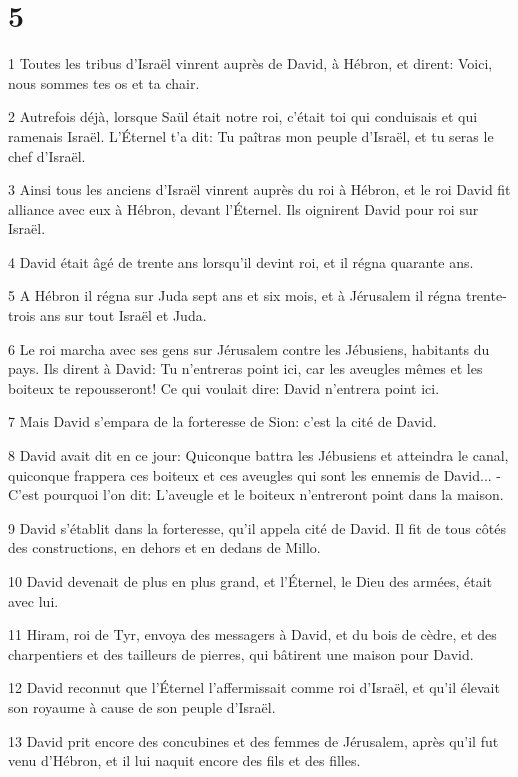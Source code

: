 \chapter{5}

\par 1 Toutes les tribus d'Israël vinrent auprès de David, à Hébron, et dirent: Voici, nous sommes tes os et ta chair.
\par 2 Autrefois déjà, lorsque Saül était notre roi, c'était toi qui conduisais et qui ramenais Israël. L'Éternel t'a dit: Tu paîtras mon peuple d'Israël, et tu seras le chef d'Israël.
\par 3 Ainsi tous les anciens d'Israël vinrent auprès du roi à Hébron, et le roi David fit alliance avec eux à Hébron, devant l'Éternel. Ils oignirent David pour roi sur Israël.
\par 4 David était âgé de trente ans lorsqu'il devint roi, et il régna quarante ans.
\par 5 A Hébron il régna sur Juda sept ans et six mois, et à Jérusalem il régna trente-trois ans sur tout Israël et Juda.
\par 6 Le roi marcha avec ses gens sur Jérusalem contre les Jébusiens, habitants du pays. Ils dirent à David: Tu n'entreras point ici, car les aveugles mêmes et les boiteux te repousseront! Ce qui voulait dire: David n'entrera point ici.
\par 7 Mais David s'empara de la forteresse de Sion: c'est la cité de David.
\par 8 David avait dit en ce jour: Quiconque battra les Jébusiens et atteindra le canal, quiconque frappera ces boiteux et ces aveugles qui sont les ennemis de David... -C'est pourquoi l'on dit: L'aveugle et le boiteux n'entreront point dans la maison.
\par 9 David s'établit dans la forteresse, qu'il appela cité de David. Il fit de tous côtés des constructions, en dehors et en dedans de Millo.
\par 10 David devenait de plus en plus grand, et l'Éternel, le Dieu des armées, était avec lui.
\par 11 Hiram, roi de Tyr, envoya des messagers à David, et du bois de cèdre, et des charpentiers et des tailleurs de pierres, qui bâtirent une maison pour David.
\par 12 David reconnut que l'Éternel l'affermissait comme roi d'Israël, et qu'il élevait son royaume à cause de son peuple d'Israël.
\par 13 David prit encore des concubines et des femmes de Jérusalem, après qu'il fut venu d'Hébron, et il lui naquit encore des fils et des filles.
